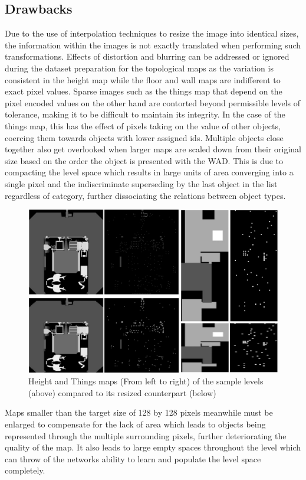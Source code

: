 \documentclass{Configuration_Files/PoliMi3i_thesis}
\begin{document}
\subsection{Drawbacks}
Due to the use of interpolation techniques to resize the image into identical sizes, 
the information within the images is not exactly translated when performing such 
transformations. Effects of distortion and blurring can be addressed or ignored 
during the dataset preparation for the topological maps as the variation is consistent 
in the height map while the floor and wall maps are indifferent to exact pixel values. 
Sparse images such as the things map that depend on the pixel encoded values on the other hand are 
contorted beyond permissible levels of tolerance, making it to be difficult to 
maintain its integrity. In the case of the things map, this has the effect of pixels taking 
on the value of other objects, coercing them towards objects with lower assigned ids. 
Multiple objects close together also get overlooked when larger maps are scaled 
down from their original size based on the order the object is presented with the 
WAD. This is due to compacting the level space which results in large units of area 
converging into a single pixel and the indiscriminate superseding by the last object in 
the list regardless of category, further dissociating the relations between object types.
\begin{figure}[H]
    \centering
    \includegraphics[width=1\textwidth]{feature_map_mistakes.jpg}
    \caption[Resized feature maps comparison]{Height and Things maps (From left to right) of the sample levels (above) 
compared to its resized counterpart (below)}
    \label{fig:featuremapistakes}
\end{figure}
Maps smaller than the target size of 128 by 128 pixels meanwhile must be 
enlarged to compensate for the lack of area which leads to objects being represented 
through the multiple surrounding pixels, further deteriorating the quality of the 
map. It also leads to large empty spaces throughout the level which can throw of the 
networks ability to learn and populate the level space completely.
\end{document}
